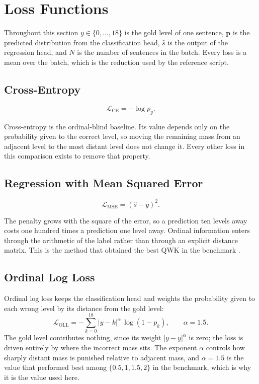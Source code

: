\section{Loss Functions}
\label{sec:meth-losses}

Throughout this section $y\in\{0,\dots,18\}$ is the gold level of one sentence, $\mathbf{p}$ is
the predicted distribution from the classification head, $\hat{s}$ is the output of the
regression head, and $N$ is the number of sentences in the batch. Every loss is a mean over the
batch, which is the reduction used by the reference script.

\subsection{Cross-Entropy}

\begin{equation}
\mathcal{L}_{\text{CE}} = -\log p_y .
\end{equation}

Cross-entropy is the ordinal-blind baseline. Its value depends only on the probability given to
the correct level, so moving the remaining mass from an adjacent level to the most distant
level does not change it. Every other loss in this comparison exists to remove that property.

\subsection{Regression with Mean Squared Error}

\begin{equation}
\mathcal{L}_{\text{MSE}} = (\hat{s}-y)^2 .
\end{equation}

The penalty grows with the square of the error, so a prediction ten levels away costs one
hundred times a prediction one level away. Ordinal information enters through the arithmetic of
the label rather than through an explicit distance matrix. This is the method that obtained the
best QWK in the benchmark \cite{elmadani2025barec}.

\subsection{Ordinal Log Loss}

Ordinal log loss \cite{castagnos2022ordinal} keeps the classification head and weights the
probability given to each wrong level by its distance from the gold level:
\begin{equation}
\mathcal{L}_{\text{OLL}} = -\sum_{k=0}^{18} |y-k|^{\alpha}\,\log\left(1-p_k\right),
\qquad \alpha = 1.5 .
\end{equation}
The gold level contributes nothing, since its weight $|y-y|^{\alpha}$ is zero; the loss is
driven entirely by where the incorrect mass sits. The exponent $\alpha$ controls how sharply
distant mass is punished relative to adjacent mass, and $\alpha=1.5$ is the value that performed
best among $\{0.5, 1, 1.5, 2\}$ in the benchmark, which is why it is the value used here.

